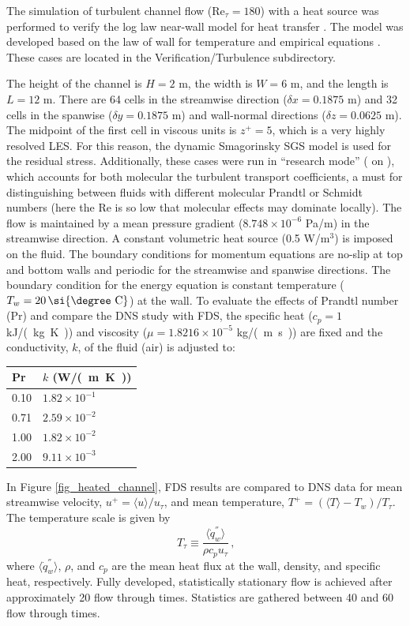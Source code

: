 \documentclass[11pt]{book}
\begin{document}
The simulation of turbulent channel flow (Re$_{\tau}=180$) with a heat source was performed to verify the log law near-wall model for heat transfer \cite{FDS_Tech_Guide}. The model was developed based on the law of wall for temperature and empirical equations \cite{Kader:1981}. These cases are located in the Verification/Turbulence subdirectory.

The height of the channel is $H=2$ m, the width is $W=6$ m, and the length is $L=12$ m. There are 64 cells in the streamwise direction ($\delta x = 0.1875$ m) and 32 cells in the spanwise ($\delta y=0.1875$ m) and wall-normal directions ($\delta z=0.0625$ m).  The midpoint of the first cell in viscous units is $z^+ = 5$, which is a very highly resolved LES. For this reason, the dynamic Smagorinsky SGS model is used for the residual stress. Additionally, these cases were run in ``research mode'' ( on ), which accounts for both molecular the turbulent transport coefficients, a must for distinguishing between fluids with different molecular Prandtl or Schmidt numbers (here the Re is so low that molecular effects may dominate locally).  The flow is maintained by a mean pressure gradient ($8.748 \times 10^{-6}$ Pa/m) in the streamwise direction. A constant volumetric heat source (0.5 W/m$^3$) is imposed on the fluid. The boundary conditions for momentum equations are no-slip at top and bottom walls and periodic for the streamwise and spanwise directions. The boundary condition for the energy equation is constant temperature ($T_w = 20 \,\mbox{\si{\degree C}} $) at the wall. To evaluate the effects of Prandtl number (Pr) and compare the DNS study \cite{Kim:1987} with FDS, the specific heat ($c_p = 1$ \si{kJ/(kg.K)}) and viscosity ($\mu = 1.8216 \times 10^{-5}$ \si{kg/(m.s)}) are fixed and the conductivity, $k$, of the fluid (air) is adjusted to:
\begin{center}
\begin{tabular}{ll}
Pr & $k$ (\si{W/(m.K)}) \\
\hline
0.10 & $1.82 \times 10^{-1}$ \\
0.71 & $2.59 \times 10^{-2}$ \\
1.00 & $1.82 \times 10^{-2}$ \\
2.00 & $9.11 \times 10^{-3}$
\end{tabular}
\end{center}

In Figure \ref{fig_heated_channel}, FDS results are compared to DNS data for mean streamwise velocity, $u^+ = \langle u \rangle/u_\tau$, and mean temperature, $T^+ = (\langle T \rangle - T_w)/T_\tau$. The temperature scale is given by
\begin{equation}
\label{eqn_friction_temperature}
T_{\tau} \equiv \frac{\langle \dot{q}_w^{''} \rangle}{{\rho}{c_p}{u_{\tau}}} \,\mbox{,}
\end{equation}
where $\langle \dot{q}_w^{''} \rangle$, $\rho$, and $c_p$ are the mean heat flux at the wall, density, and specific heat, respectively.  Fully developed, statistically stationary flow is achieved after approximately 20 flow through times.  Statistics are gathered between 40 and 60 flow through times.
\end{document}
